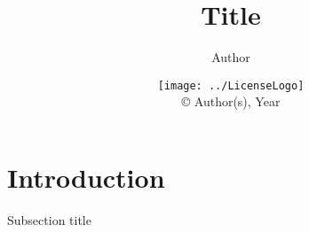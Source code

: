 

\title{Title}
\author{Author}
\date{\texttt{[image: ../LicenseLogo]}\\\copyright{} Author(s), Year}


	\frame{\titlepage}
	\section{Introduction}
	\begin{namedframe}{Subsection title}
	\end{namedframe}

